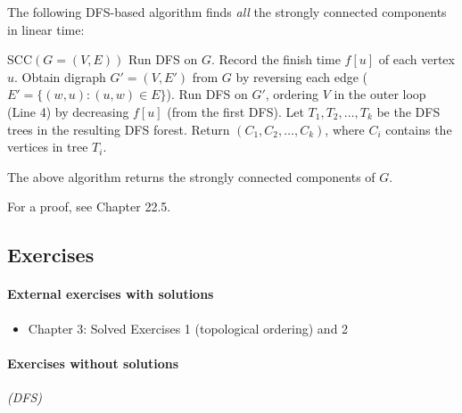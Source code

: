 \documentclass[11pt]{article}
\begin{document}
\smallskip

The following DFS-based algorithm finds \emph{all} the strongly connected components in linear time:
\begin{myframed}
\begin{steps}
  \item[] {\sf SCC}$(G=(V,E))$ 
  \step Run DFS on $G$.  Record the finish time $f[u]$ of each vertex $u$.
  \step Obtain digraph $G'=(V,E')$ from $G$
  by reversing each edge ($E'=\{(w,u) : (u,w)\in E\}$).
  \step Run DFS on $G'$, ordering $V$ in the outer loop (Line 4)
  by decreasing $f[u]$ (from the first DFS).
  \step Let $T_1, T_2, \ldots, T_k$ be the DFS trees in the resulting DFS forest.
  \step Return $(C_1, C_2, \ldots, C_k)$, where $C_i$ contains the vertices in tree $T_i$.
\end{steps}
\end{myframed}

\begin{lemma}
  The above algorithm returns the strongly connected components of $G$.
\end{lemma}
For a proof, see \CLRS Chapter 22.5.

\subsection{Exercises}

\paragraph{External exercises with solutions}

\begin{itemize}
\item \KT Chapter 3: Solved Exercises 1 (topological ordering) and 2
\end{itemize}

\paragraph{Exercises without solutions}

\exercise\label{graphs: exercise: DFS}\emph{(DFS)}
\end{document}
